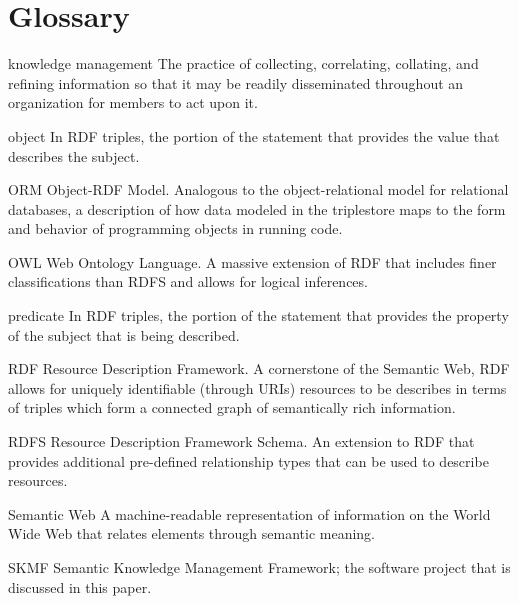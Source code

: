 %
%
\chapter*{Glossary}      %
\thispagestyle{plain}

\begin{glossary}

\item[knowledge management] The practice of collecting, correlating, collating, and refining information so that it may be readily disseminated throughout an organization for members to act upon it.

\item[object] In RDF triples, the portion of the statement that provides the value that describes the subject.

\item[ORM] Object-RDF Model. Analogous to the object-relational model for relational databases, a description of how data modeled in the triplestore maps to the form and behavior of programming objects in running code.

\item[OWL] Web Ontology Language. A massive extension of RDF that includes finer classifications than RDFS and allows for logical inferences.

\item[predicate] In RDF triples, the portion of the statement that provides the property of the subject that is being described.

\item[RDF] Resource Description Framework. A cornerstone of the Semantic Web, RDF allows for uniquely identifiable (through URIs) resources to be describes in terms of triples which form a connected graph of semantically rich information.

\item[RDFS] Resource Description Framework Schema. An extension to RDF that provides additional pre-defined relationship types that can be used to describe resources.

\item[Semantic Web] A machine-readable representation of information on the World Wide Web that relates elements through semantic meaning.

\item[SKMF] Semantic Knowledge Management Framework; the software project that is discussed in this paper.


\end{glossary}
